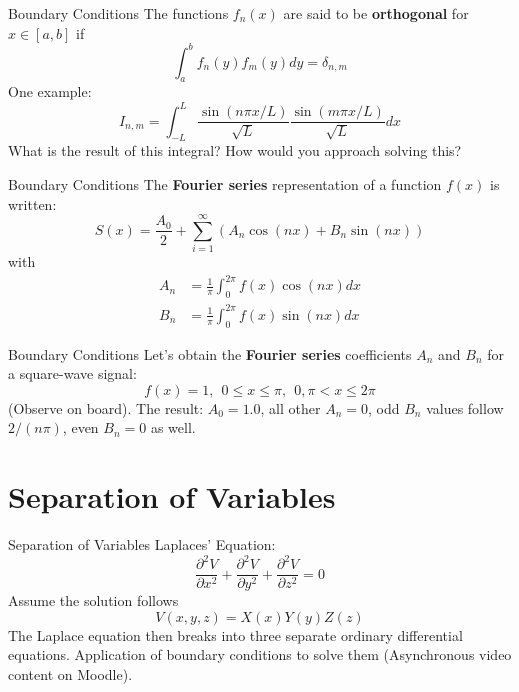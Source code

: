 \documentclass{beamer}
\begin{document}
\begin{frame}{Boundary Conditions}
The functions $f_n(x)$ are said to be \textbf{\alert{orthogonal}} for $x \in [a,b]$ if
\begin{equation}
\int_a^b f_n(y) f_m(y) dy = \delta_{n,m}
\end{equation}
One example:
\begin{equation}
I_{n,m} = \int_{-L}^{L} \frac{\sin(n\pi x/L)}{\sqrt{L}}\frac{\sin(m\pi x/L)}{\sqrt{L}} dx
\end{equation}
What is the result of this integral?  How would you approach solving this?
\end{frame}

\begin{frame}{Boundary Conditions}
The \alert{\textbf{Fourier series}} representation of a function $f(x)$ is written:
\begin{equation}
S(x) = \frac{A_0}{2}+\sum_{i=1}^{\infty} \left( A_n \cos(nx) + B_n \sin(nx) \right)
\end{equation}
with
\begin{align}
A_n &= \frac{1}{\pi} \int_0^{2\pi} f(x) \cos(nx) dx \\
B_n &= \frac{1}{\pi} \int_0^{2\pi} f(x) \sin(nx) dx
\end{align}
\end{frame}

\begin{frame}{Boundary Conditions}
Let's obtain the \alert{\textbf{Fourier series}} coefficients $A_n$ and $B_n$ for a square-wave signal:
\begin{equation}
f(x) = 1, ~~ 0 \leq x \leq \pi, ~~ 0,  \pi < x \leq 2\pi 
\end{equation}
(Observe on board).  The result: $A_0 = 1.0$, all other $A_n = 0$, odd $B_n$ values follow $2/(n\pi)$, even $B_n = 0$ as well.
\end{frame}

\section{Separation of Variables}

\begin{frame}{Separation of Variables}
Laplaces' Equation:
\begin{equation}
\frac{\partial^2 V}{\partial x^2} + \frac{\partial^2 V}{\partial y^2} + \frac{\partial^2 V}{\partial z^2} = 0
\end{equation}
Assume the solution follows
\begin{equation}
V(x,y,z) = X(x) Y(y) Z(z)
\end{equation}
The Laplace equation then breaks into three separate ordinary differential equations. Application of boundary conditions to solve them (Asynchronous video content on Moodle).
\end{frame}
\end{document}
